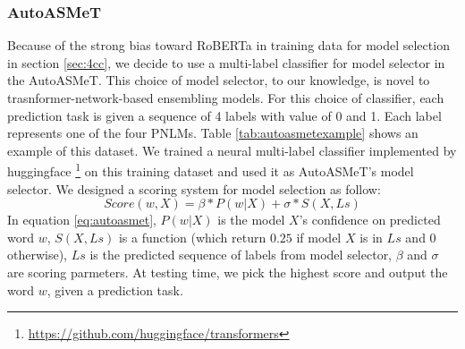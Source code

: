 \documentclass[11pt]{article}
\begin{document}
\subsubsection{AutoASMeT}

Because of the strong bias toward RoBERTa in training data for model selection in section \ref{sec:4cc}, we decide to use a multi-label classifier for model selector in the AutoASMeT. This choice of model selector, to our knowledge, is novel to trasnformer-network-based ensembling models. For this choice of classifier, each prediction task is given a sequence of 4 labels with value of 0 and 1. Each label represents one of the four PNLMs. Table \ref{tab:autoasmetexample} shows an example of this dataset. We trained a neural multi-label classifier implemented by huggingface \footnote{\url{https://github.com/huggingface/transformers}} on this training dataset and used it as AutoASMeT's model selector. We designed a scoring system for model selection as follow:
\begin{equation} \label{eq:autoasmet}
	Score(w, X) = \beta * P(w|X) + \sigma * S(X, Ls)
\end{equation}
In equation \ref{eq:autoasmet}, $P(w|X)$ is the model $X$'s confidence on predicted word $w$, $S(X, Ls)$ is a function (which return $0.25$ if model $X$ is in $Ls$ and $0$ otherwise), $Ls$ is the predicted sequence of labels from model selector, $\beta$ and $\sigma$ are scoring parmeters.  
At testing time, we pick the highest score and output the word $w$, given a prediction task.

\begin{table}
    \centering
    \caption{An example of tranining data for the AutoASMeT model. For a prediction task, a sequence of 4 labels is give in the order "RoBERTa BERT XLNet GPT-2". The value of 1 means the model correctly predict the right word, and 0 otherwise.}
    \label{tab:autoasmetexample}
\end{table}
\end{document}
